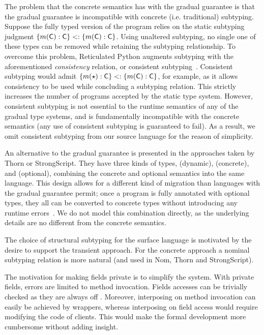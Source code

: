 \documentclass[USenglish]{tex/lipics-v2016}
\begin{document}
The problem that the concrete semantics has with the gradual guarantee is
that the gradual guarantee is incompatible with concrete (i.e. traditional)
subtyping. Suppose the fully typed version of the program relies on the static
subtyping judgment $\{m(\C):\C\} <: \{m(\C):\C\}$. Using unaltered subtyping,
no single one of these \C types can be removed while retaining the subtyping 
relationship. To overcome this problem, Reticulated Python augments subtyping
with the aforementioned \emph{consistency} relation, or consistent subtyping~\cite{siek14,SiekTaha07}.
Consistent subtyping would admit $\{m(\any):\C\} <: \{m(\C):\C\}$, for example, 
as it allows consistency to be used while concluding a subtyping relation.
This strictly increases the number of programs accepted by the static type
system. However, consistent subtyping is not essential to the runtime semantics of any
of the gradual type systems, and is fundamentally incompatible with the concrete
semantics (any use of consistent subtyping is guaranteed to fail). As a result,
we omit consistent subtyping from our source language for the reason of 
simplicity.

An alternative to the gradual guarantee is presented in the approaches
taken by Thorn or StrongScript. They have three kinds of types, \any (dynamic),
\C (concrete), and  \C (optional), combining the concrete and
optional semantics into the same language. This design allows for a different
kind of migration than languages with the gradual guarantee permit; once
a program is fully annotated with optional types, they all can be
converted to concrete types without introducing any runtime errors~\cite{ecoop15}.
We do not model this combination directly, as the underlying details
are no different from the concrete semantics.

The choice of structural subtyping for the surface language is motivated by
the desire to support the transient approach. For the concrete approach a
nominal subtyping relation is more natural (and used in Nom, Thorn and
StrongScript).

The motivation for making fields private is to simplify the system. With
private fields, errors are limited to method invocation. Fields accesses can
be trivially checked as they are always off \this. Moreover, interposing on
method invocation can easily be achieved by wrappers, whereas interposing
on field access would require modifying the code of clients. This would make
the formal development more cumbersome without adding insight.
\end{document}
